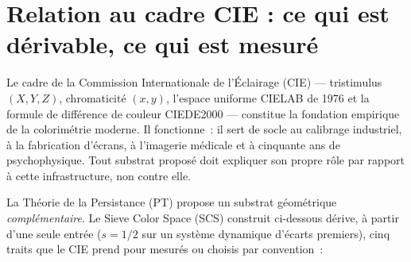 \documentclass[12pt,a4paper]{article}
\begin{document}
\begin{abstract}
\medskip\noindent\textbf{Invitations ouvertes.} Trois pr\'edictions
falsifiables, chacune r\'ealisable en trois mois d'exp\'erience, sont
\'enonc\'ees en \S\ref{sec:open_problems}~: un test JND nul au point
de saturation de Koide $S/S_{\max} = 1/\sqrt{2}$~; un plafond de
discrimination chromatique \`a $3 \times 5 \times 7 = 105$ \'etats,
motiv\'e par le CRT~; et la signature d'un quatri\`eme canal issu de
$p = 11$ chez les t\'etrachromates. Le code, les d\'ecoupages COMBVD,
les ajustements MacAdam et un classement public sont diffus\'es
\`a \href{https://github.com/Igrekess/SieveColorSpace}{github.com/Igrekess/SieveColorSpace}
(archiv\'e sur Zenodo~: \href{https://zenodo.org/records/19614967}{10.5281/zenodo.19614967} pour cet article~; la monographie Th\'eorie de la Persistance associ\'ee est sur \href{https://zenodo.org/records/19583187}{10.5281/zenodo.19583187}).
Nous ne pr\'etendons pas que le SCS soit achev\'e~; nous affirmons
qu'il est testable.
Cet article est autonome~: un appendice fournit les d\'erivations
autonomes des r\'esultats de la Th\'eorie de la Persistance utilis\'es
--- transitions interdites du crible, param\`etre $s = 1/2$, r\`egle
de somme, bifurcation sommet--ar\^ete, identit\'e d'holonomie,
dimensions anomales, crit\`ere de premier actif et point fixe
$\mustar = 15$ --- de sorte qu'aucune r\'ef\'erence ext\'erieure n'est
n\'ecessaire pour v\'erifier la cha\^ine d\'eductive.
\end{abstract}

\tableofcontents
\newpage

\section{Relation au cadre CIE : ce qui est d\'erivable, ce qui est mesur\'e}
\label{sec:intro}

Le cadre de la Commission Internationale de l'\'Eclairage (CIE) ---
tristimulus $(X, Y, Z)$, chromaticit\'e $(x, y)$, l'espace uniforme
CIELAB de 1976 et la formule de diff\'erence de couleur CIEDE2000 ---
constitue la fondation empirique de la colorim\'etrie moderne. Il
fonctionne~: il sert de socle au calibrage industriel, \`a la
fabrication d'\'ecrans, \`a l'imagerie m\'edicale et \`a cinquante ans
de psychophysique. Tout substrat propos\'e doit expliquer son propre
r\^ole par rapport \`a cette infrastructure, non contre elle.

La Th\'eorie de la Persistance (PT) propose un substrat g\'eom\'etrique
\emph{compl\'ementaire}. Le Sieve Color Space (SCS) construit
ci-dessous d\'erive, \`a partir d'une seule entr\'ee ($s = 1/2$ sur un
syst\`eme dynamique d'\'ecarts premiers), cinq traits que le CIE prend
pour mesur\'es ou choisis par convention~:
\end{document}
